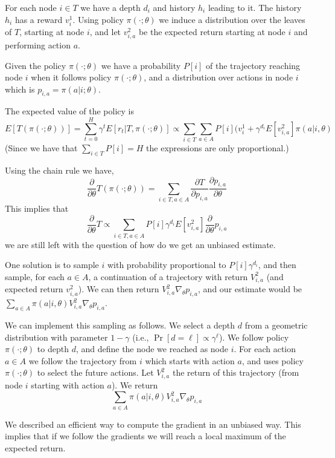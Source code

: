For each node $i\in T$ we have a depth $d_i$ and history $h_i$
leading to it. The history $h_i$ has a reward $v^1_i$. Using policy
$\pi(\cdot;\theta)$ we induce a distribution over the leaves of $T$,
starting at node $i$, and let $v^2_{i,a}$ be the expected return
starting at node $i$ and performing action $a$.

Given the policy $\pi(\cdot;\theta)$ we have a  probability $P[i]$
of the trajectory reaching node $i$ when it follows policy
$\pi(\cdot;\theta)$, and a distribution over actions in node $i$
which is $p_{i,a}=\pi(a|i;\theta)$.

The expected value of the policy is
\[
E[T(\pi(\cdot;\theta))]=\sum_{t=0}^H \gamma^t
E[r_t|T,\pi(\cdot;\theta)]\propto \sum_{i\in T}\sum_{a\in A}
P[i](v^1_i+\gamma^{d_i}E[v^2_{i,a}]\pi(a|i,\theta)
\]
(Since we have that $\sum_{i\in T} P[i]=H$ the expressions are only
proportional.)

Using the chain rule we have,
\[
%
\frac{\partial}{\partial \theta} T(\pi(\cdot;\theta))= \sum_{i\in
T,a\in A} \frac{\partial T}{\partial p_{i,a}} \frac{\partial
p_{i,a}}{\partial \theta}
\]
This implies that
\[
\frac{\partial}{\partial \theta} T\propto \sum_{i\in T,a\in A}
P[i]\gamma^{d_i}E[v^2_{i,a}]\frac{\partial}{\partial \theta} p_{i,a}
\]
we are still left with the question of how do we get an unbiased
estimate.

One solution is to sample $i$ with probability proportional to
$P[i]\gamma^{d_i}$, and then sample, for each $a\in A$, a
continuation of a trajectory with return $V^2_{i,a}$ (and expected
return $v^2_{i,a}$). We can then return $V^2_{i,a}\nabla_\theta
p_{i,a}$, and our estimate would be $\sum_{a\in A}
\pi(a|i,\theta)V^2_{i,a} \nabla_\theta p_{i,a}$.

We can implement this sampling as follows. We select a depth $d$
from a geometric distribution with parameter $1-\gamma$ (i.e.,
$\Pr[d=\ell]\propto \gamma^\ell$). We follow policy $\pi(\cdot
;\theta)$ to depth $d$, and define the node we reached as node $i$.
For each action $a\in A$ we follow the trajectory from $i$ which
starts with action $a$, and uses policy $\pi(\cdot ;\theta)$ to
select the future actions. Let $V^2_{i,a}$ the return of this
trajectory (from node $i$ starting with action $a$). We return
$$\sum_{a\in A}
\pi(a|i,\theta)V^2_{i,a} \nabla_\theta p_{i,a}
$$

We described an efficient way to compute the gradient in an unbiased
way. This implies that if we follow the gradients we will reach a
local maximum of the expected return.

